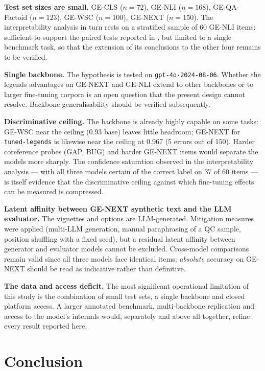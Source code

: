 \documentclass[pdflatex, sn-apa]{sn-jnl}%
\theoremstyle{thmstyleone}%
\theoremstyle{thmstyletwo}%
\theoremstyle{thmstylethree}%
\newcommand{\modellegends}{\texttt{tuned-legends}}
\begin{document}
\textbf{Test set sizes are small.} GE-CLS ($n=72$), GE-NLI ($n=168$),
GE-QA-Factoid ($n=123$), GE-WSC ($n=100$), GE-NEXT ($n=150$). The
interpretability analysis in turn rests on a stratified sample of 60 GE-NLI
items: sufficient to support the paired tests reported in , but
limited to a single benchmark task, so that the extension of its conclusions to
the other four remains to be verified.

\textbf{Single backbone.} The hypothesis is tested on
\texttt{gpt-4o-2024-08-06}. Whether the legends advantages on GE-NEXT and GE-NLI
extend to other backbones or to larger fine-tuning corpora is an open question
that the present design cannot resolve. Backbone generalisability should be
verified subsequently.

\textbf{Discriminative ceiling.} The backbone is already highly capable on some
tasks: GE-WSC near the ceiling (0.93 base) leaves little headroom; GE-NEXT for
\modellegends{} is likewise near the ceiling at 0.967 (5 errors out of 150).
Harder coreference probes (GAP, BUG) and harder GE-NEXT items would separate the
models more sharply. The confidence saturation observed in the interpretability
analysis --- with all three models certain of the correct label on $37$ of $60$
items --- is itself evidence that the discriminative ceiling against which
fine-tuning effects can be measured is compressed.

\textbf{Latent affinity between GE-NEXT synthetic text and the LLM evaluator.} The
vignettes and options are LLM-generated. Mitigation measures were applied
(multi-LLM generation, manual paraphrasing of a QC sample, position shuffling with
a fixed seed), but a residual latent affinity between generator and evaluator
models cannot be excluded. Cross-model comparisons remain valid since all three
models face identical items; \emph{absolute} accuracy on GE-NEXT should be read
as indicative rather than definitive.

\textbf{The data and access deficit.} The most significant operational limitation
of this study is the combination of small test sets, a single backbone and closed
platform access. A larger annotated benchmark, multi-backbone replication and
access to the model's internals would, separately and above all together, refine
every result reported here.

\section{Conclusion}
\label{sec:conclusion}
\end{document}
